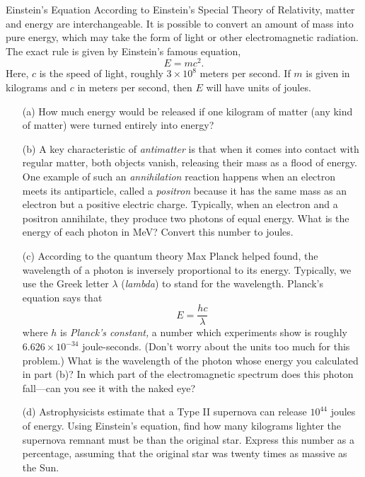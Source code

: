 \documentclass[12pt]{article}
\begin{document}
\begin{probdesc}{8}{Einstein's Equation}
According to Einstein's Special Theory of Relativity, matter and
energy are interchangeable.  It is possible to convert an amount of
mass into pure energy, which may take the form of light or other
electromagnetic radiation.  The exact rule is given by Einstein's
famous equation,
\begin{equation}
E = mc^2.
\end{equation}
Here, $c$ is the speed of light, roughly $3\times10^8$ meters per
second.  If $m$ is given in kilograms and $c$ in meters per second,
then $E$ will have units of joules.
\begin{enumerate}
\item[(a)] How much energy would be released if one kilogram of matter (any
  kind of matter) were turned entirely into energy?

\item[(b)] A key characteristic of {\em antimatter} is that when it comes
  into contact with regular matter, both objects vanish, releasing
  their mass as a flood of energy.  One example of such an {\em
  annihilation} reaction happens when an electron meets its
  antiparticle, called a {\em positron} because it has the same mass
  as an electron but a positive electric charge.  Typically, when an
  electron and a positron annihilate, they produce two photons of
  equal energy.  What is the energy of each photon in MeV?  Convert
  this number to joules.

\item[(c)] According to the quantum theory Max Planck helped found,
  the wavelength of a photon is inversely proportional to its energy.
  Typically, we use the Greek letter $\lambda$ ({\em lambda}) to stand
  for the wavelength.  Planck's equation says that
  \begin{equation}
    E = \frac{hc}{\lambda}
  \end{equation}
  where $h$ is {\em Planck's constant,} a number which experiments
  show is roughly $6.626\times10^{-34}$ joule-seconds.  (Don't worry
  about the units too much for this problem.)  What is the wavelength
  of the photon whose energy you calculated in part (b)?  In which
  part of the electromagnetic spectrum does this photon fall---can you
  see it with the naked eye?

\item[(d)] Astrophysicists estimate that a Type II supernova can
  release $10^{44}$ joules of energy.  Using Einstein's equation, find
  how many kilograms lighter the supernova remnant must be than the
  original star.  Express this number as a percentage, assuming that
  the original star was twenty times as massive as the Sun.
\end{enumerate}
\end{probdesc}
\end{document}
